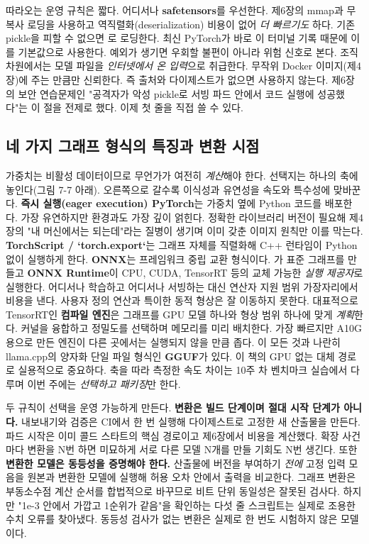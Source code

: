 따라오는 운영 규칙은 짧다. 어디서나 \textbf{safetensors}를 우선한다. 제6장의 mmap과 무복사 로딩을 사용하고 역직렬화(deserialization) 비용이 없어 \textit{더 빠르기도} 하다. 기존 pickle을 피할 수 없으면 로 로딩한다. 최신 PyTorch가 바로 이 터미널 기록 때문에 이를 기본값으로 사용한다. 예외가 생기면 우회할 불편이 아니라 위험 신호로 본다. 조직 차원에서는 모델 파일을 \textit{인터넷에서 온 입력}으로 취급한다. 무작위 Docker 이미지(제4장)에 주는 만큼만 신뢰한다. 즉 출처와 다이제스트가 없으면 사용하지 않는다. 제6장의 보안 연습문제인 "공격자가 악성 pickle로 서빙 파드 안에서 코드 실행에 성공했다"는 이 절을 전제로 했다. 이제 첫 줄을 직접 쓸 수 있다.

\subsection*{네 가지 그래프 형식의 특징과 변환 시점}

가중치는 비활성 데이터이므로 무언가가 여전히 \textit{계산}해야 한다. 선택지는 하나의 축에 놓인다(그림 7-7 아래). 오른쪽으로 갈수록 이식성과 유연성을 속도와 특수성에 맞바꾼다. \textbf{즉시 실행(eager execution) PyTorch}는 가중치 옆에 Python 코드를 배포한다. 가장 유연하지만 환경과도 가장 깊이 얽힌다. 정확한 라이브러리 버전이 필요해 제4장의 "내 머신에서는 되는데"라는 질병이 생기며 이미 갖춘 이미지 원칙만 이를 막는다. \textbf{TorchScript / `torch.export`}는 그래프 자체를 직렬화해 C++ 런타임이 Python 없이 실행하게 한다. \textbf{ONNX}는 프레임워크 중립 교환 형식이다. 가 표준 그래프를 만들고 \textbf{ONNX Runtime}이 CPU, CUDA, TensorRT 등의 교체 가능한 \textit{실행 제공자}로 실행한다. 어디서나 학습하고 어디서나 서빙하는 대신 연산자 지원 범위 가장자리에서 비용을 낸다. 사용자 정의 연산과 특이한 동적 형상은 잘 이동하지 못한다. 대표적으로 TensorRT인 \textbf{컴파일 엔진}은 그래프를 GPU 모델 하나와 형상 범위 하나에 맞게 \textit{계획}한다. 커널을 융합하고 정밀도를 선택하며 메모리를 미리 배치한다. 가장 빠르지만 A10G용으로 만든 엔진이 다른 곳에서는 실행되지 않을 만큼 좁다. 이 모든 것과 나란히 llama.cpp의 양자화 단일 파일 형식인 \textbf{GGUF}가 있다. 이 책의 GPU 없는 대체 경로로 실용적으로 중요하다. 축을 따라 측정한 속도 차이는 10주 차 벤치마크 실습에서 다루며 이번 주에는 \textit{선택하고 패키징}만 한다.

두 규칙이 선택을 운영 가능하게 만든다. \textbf{변환은 빌드 단계이며 절대 시작 단계가 아니다.} 내보내기와 검증은 CI에서 한 번 실행해 다이제스트로 고정한 새 산출물을 만든다. 파드 시작은 이미 콜드 스타트의 핵심 경로이고 제6장에서 비용을 계산했다. 확장 사건마다 변환을 N번 하면 미묘하게 서로 다른 모델 N개를 만들 기회도 N번 생긴다. 또한 \textbf{변환한 모델은 동등성을 증명해야 한다.} 산출물에 버전을 부여하기 \textit{전에} 고정 입력 모음을 원본과 변환한 모델에 실행해 허용 오차 안에서 출력을 비교한다. 그래프 변환은 부동소수점 계산 순서를 합법적으로 바꾸므로 비트 단위 동일성은 잘못된 검사다. 하지만 "1e-3 안에서 가깝고 1순위가 같음"을 확인하는 다섯 줄 스크립트는 실제로 조용한 수치 오류를 찾아냈다. 동등성 검사가 없는 변환은 실제로 한 번도 시험하지 않은 모델이다.

